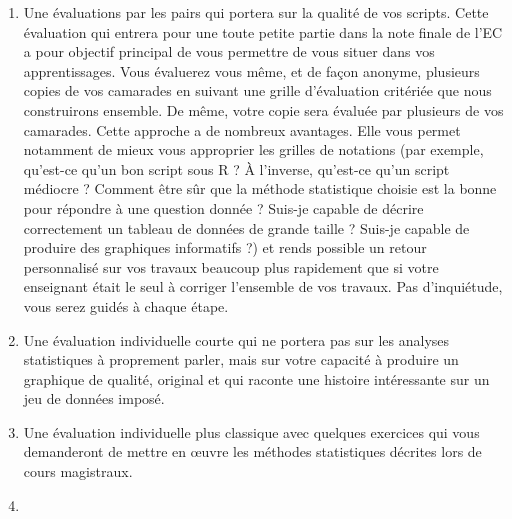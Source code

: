 \documentclass[
  a4paper,
]{article}
\begin{document}
\begin{enumerate}
\def\labelenumi{\arabic{enumi}.}
\item
  Une évaluations par les pairs qui portera sur la qualité de vos scripts. Cette évaluation qui entrera pour une toute petite partie dans la note finale de l'EC a pour objectif principal de vous permettre de vous situer dans vos apprentissages. Vous évaluerez vous même, et de façon anonyme, plusieurs copies de vos camarades en suivant une grille d'évaluation critériée que nous construirons ensemble. De même, votre copie sera évaluée par plusieurs de vos camarades. Cette approche a de nombreux avantages. Elle vous permet notamment de mieux vous approprier les grilles de notations (par exemple, qu'est-ce qu'un bon script sous R ? À l'inverse, qu'est-ce qu'un script médiocre ? Comment être sûr que la méthode statistique choisie est la bonne pour répondre à une question donnée ? Suis-je capable de décrire correctement un tableau de données de grande taille ? Suis-je capable de produire des graphiques informatifs ?) et rends possible un retour personnalisé sur vos travaux beaucoup plus rapidement que si votre enseignant était le seul à corriger l'ensemble de vos travaux. Pas d'inquiétude, vous serez guidés à chaque étape.
\item
  Une évaluation individuelle courte qui ne portera pas sur les analyses statistiques à proprement parler, mais sur votre capacité à produire un graphique de qualité, original et qui raconte une histoire intéressante sur un jeu de données imposé.
\item
  Une évaluation individuelle plus classique avec quelques exercices qui vous demanderont de mettre en œuvre les méthodes statistiques décrites lors de cours magistraux.
\item

\end{enumerate}
\end{document}

